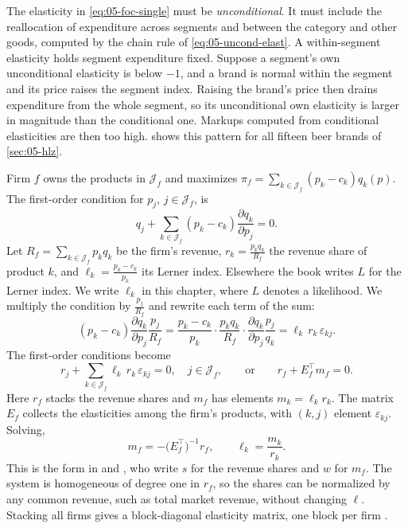 The elasticity in \eqref{eq:05-foc-single} must be \emph{unconditional}. It must include the reallocation of
expenditure across segments and between the category and other goods, computed by the chain rule of
\eqref{eq:05-uncond-elast}. A within-segment elasticity holds segment expenditure fixed. Suppose a segment's
own unconditional elasticity is below $-1$, and a brand is normal within the segment and its price raises the
segment index. Raising the brand's price then drains expenditure from the whole segment, so its unconditional own
elasticity is larger in magnitude than the conditional one. Markups computed from
conditional elasticities are then too high.  shows this pattern for all fifteen beer
brands of \cref{sec:05-hlz}.

Firm $f$ owns the products in $\mathcal{J}_f$ and maximizes $\pi_f = \sum_{k\in\mathcal{J}_f}(p_k - c_k)q_k(p)$.
The first-order condition for $p_j$, $j\in\mathcal{J}_f$, is
\begin{equation*}
  q_j + \sum_{k\in\mathcal{J}_f}(p_k - c_k)\frac{\partial q_k}{\partial p_j} = 0.
\end{equation*}
Let $R_f = \sum_{k\in\mathcal{J}_f}p_kq_k$ be the firm's revenue, $r_k = \frac{p_kq_k}{R_f}$ the revenue share
of product $k$, and $\ell_k = \frac{p_k - c_k}{p_k}$ its Lerner index. Elsewhere the book writes $L$ for the
Lerner index. We write $\ell_k$ in this chapter, where $L$ denotes a likelihood. We multiply the condition by
$\frac{p_j}{R_f}$ and rewrite each term of the sum:
\begin{equation*}
  (p_k - c_k)\frac{\partial q_k}{\partial p_j}\frac{p_j}{R_f}
  = \frac{p_k - c_k}{p_k}\cdot\frac{p_kq_k}{R_f}\cdot\frac{\partial q_k}{\partial p_j}\frac{p_j}{q_k}
  = \ell_k\,r_k\,\varepsilon_{kj}.
\end{equation*}
The first-order conditions become
\begin{equation}\label{eq:05-foc-multi}
  r_j + \sum_{k\in\mathcal{J}_f}\ell_k\,r_k\,\varepsilon_{kj} = 0, \quad j\in\mathcal{J}_f,
  \qquad\text{or}\qquad r_f + E_f^\top m_f = 0.
\end{equation}
Here $r_f$ stacks the revenue shares and $m_f$ has elements $m_k = \ell_kr_k$. The matrix $E_f$ collects the
elasticities among the firm's products, with $(k,j)$ element $\varepsilon_{kj}$. Solving,
\begin{equation}\label{eq:05-markup-multi}
  m_f = -\bigl(E_f^\top\bigr)^{-1}r_f, \qquad \ell_k = \frac{m_k}{r_k}.
\end{equation}
This is the form in \citet[eqs.~7--9 and 14--15]{HausmanLeonardZona1994} and \citet[eqs.~12--15]{Hausman1997},
who write $s$ for the revenue shares and $w$ for $m_f$. The system is homogeneous of degree one in $r_f$, so
the shares can be normalized by any common revenue, such as total market revenue, without changing $\ell$.
Stacking all firms gives a block-diagonal elasticity matrix, one block per firm
\citep[eq.~14]{HausmanLeonardZona1994}.

